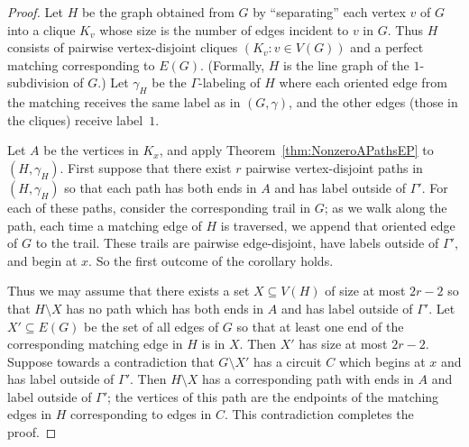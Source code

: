 \documentclass[11pt]{article}
\theoremstyle{definition}
\begin{document}
\begin{proof}
    Let $H$ be the graph obtained from $G$ by ``separating'' each vertex $v$ of $G$ into a clique $K_v$ whose size is the number of edges incident to $v$ in $G$. Thus $H$ consists of pairwise vertex-disjoint cliques $(K_v: v \in V(G))$ and a perfect matching corresponding to $E(G)$. (Formally, $H$ is the line graph of the $1$-subdivision of $G$.) Let $\gamma_H$ be the $\Gamma$-labeling of $H$ where each oriented edge from the matching receives the same label as in $(G, \gamma)$, and the other edges (those in the cliques) receive label~$1$.



    Let $A$ be the vertices in $K_x$, and apply Theorem~\ref{thm:NonzeroAPathsEP} to $(H, \gamma_H)$. First suppose that there exist $r$ pairwise vertex-disjoint paths in $(H, \gamma_H)$ so that each path has both ends in $A$ and has label outside of $\Gamma'$. For each of these paths, consider the corresponding trail in $G$; as we walk along the path, each time a matching edge of $H$ is traversed, we append that oriented edge of $G$ to the trail. These trails are pairwise edge-disjoint, have labels outside of $\Gamma'$, and begin at $x$. So the first outcome of the corollary holds. 

    Thus we may assume that there exists a set $X \subseteq V(H)$ of size at most $2r-2$ so that $H\setminus X$ has no path which has both ends in $A$ and has label outside of $\Gamma'$. Let $X' \subseteq E(G)$ be the set of all edges of $G$ so that at least one end of the corresponding matching edge in $H$ is in $X$. Then $X'$ has size at most $2r-2$. Suppose towards a contradiction that $G\setminus X'$ has a circuit $C$ which begins at $x$ and has label outside of $\Gamma'$. Then $H\setminus X$ has a corresponding path with ends in $A$ and label outside of $\Gamma'$; the vertices of this path are the endpoints of the matching edges in $H$ corresponding to edges in $C$. This contradiction completes the proof.
\end{proof}
\end{document}
